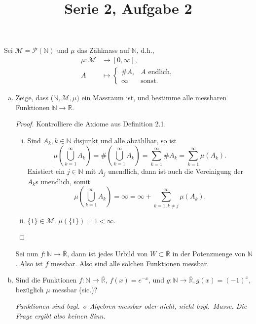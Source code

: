 \documentclass[11pt]{article}\usepackage[]{graphicx}\usepackage[]{color}
\title{Serie 2, Aufgabe 2}
\date{}
\newcommand{\N}{\mathbb{N}}
\newcommand{\R}{\mathbb{R}}
\begin{document}
\maketitle
Sei $\mathcal{M} = \mathcal{P}(\N)$ und
$\mu$ das Zählmass auf $\N$, d.h.,
\begin{align*}
  \mu : \mathcal{M} &\to [0, \infty],\\
  A &\mapsto
  \begin{cases}
    \#A, & \textrm{$A$ endlich},\\
    \infty & \textrm{sonst}.
  \end{cases}
\end{align*}
\begin{enumerate}[(a)]
  \item Zeige, dass ($\N, \mathcal{M}, \mu)$ ein Massraum
  ist, und bestimme alle messbaren Funktionen 
  $\N \to \overline{\R}$.
  \begin{proof}
    Kontrolliere die Axiome aus Definition 2.1.
    \begin{enumerate}[(i)]
      \item Sind $A_k, k \in \N$ disjunkt und 
      alle abzählbar, so ist 
      \[
      \mu\left(\bigcup_{k = 1}^{\infty} A_k\right) = \# (\bigcup_{k = 1}^{\infty} A_k) = \sum_{k = 1}^{\infty} \# A_k = \sum_{k = 1}^{\infty} \mu(A_k).
      \]
      Existiert ein $j \in \N$ mit $A_j$ unendlich, dann
      ist auch die Vereinigung der $A_k$s unendlich,
      somit
      \[
      \mu\left(\bigcup_{k = 1}^{\infty} A_k\right) = 
      \infty = \infty + \sum_{k = 1, k\neq j}^{\infty} \mu(A_k).
      \]
      
      \item $\{1\} \in \mathcal{M}.$ $\mu(\{1\}) = 1 < \infty.$\qedhere
    \end{enumerate}
  \end{proof}
  
  Sei nun $f : \N \to \overline{\R}$, dann ist jedes
  Urbild von $W \subset \overline{\R}$ in der Potenzmenge
  von $\N$. Also ist $f$ messbar. Also sind alle solchen
  Funktionen messbar.
  
  \item Sind die Funktionen $f: \N \to \overline{\R}$,
  $f(x) = e^{-x}$, und
  $g: \N \to \overline{\R}, g(x) = (-1)^x$, bezüglich
  $\mu$ messbar (sic.)?
  
  \textit{Funktionen sind bzgl.\ $\sigma$-Algebren messbar oder nicht, nicht bzgl.\ Masse. Die Frage ergibt also keinen Sinn.}
\end{enumerate}
\end{document}
